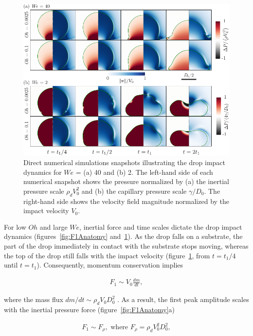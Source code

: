 \documentclass{jfm}
\begin{document}
	\begin{figure}
		\centering
		\includegraphics[width=\textwidth]{Figures/F1_Drops_LowOh_v2.pdf}
		\caption{Direct numerical simulations snapshots illustrating the drop impact dynamics for $We$ = (a) 40 and (b) 2. The left-hand side of each numerical snapshot shows the pressure normalized by (a) the inertial pressure scale $\rho_dV_0^2$ and (b) the capillary pressure scale $\gamma/D_0$. The right-hand side shows the velocity field magnitude normalized by the impact velocity $V_0$.}
		\label{fig:F1AnatomyLowOh}
	\end{figure}
	
	For low $Oh$ and large $We$, inertial force and time scales dictate the drop impact dynamics (figures~\ref{fig:F1Anatomy} and~\ref{fig:F1AnatomyLowOh}). As the drop falls on a substrate, the part of the drop immediately in contact with the substrate stops moving, whereas the top of the drop still falls with the impact velocity (figure~\ref{fig:F1AnatomyLowOh}, from $t = t_1/4$ until $t = t_1$). Consequently, momentum conservation implies 
	
	\begin{align}
		F_1 \sim V_0\frac{dm}{dt},
	\end{align}
	
	\noindent where the mass flux $dm/dt \sim \rho_d V_0D_0^2$ \citep{Soto2014, zhang2022impact}. As a result, the first peak amplitude scales with the inertial pressure force (figure~\ref{fig:F1Anatomy}a)
	
	\begin{align}\label{eq:F1}
		F_1 \sim F_\rho,\text{ where }F_\rho =  \rho_d V_0^2D_0^2,
	\end{align}
	
\end{document}
